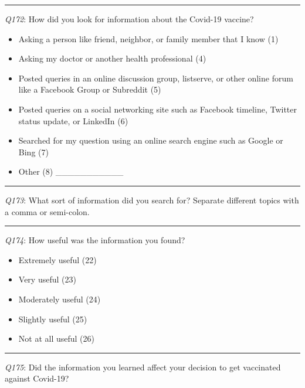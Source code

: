 \begin{singlespace}
\begin{center}\rule{0.5\linewidth}{0.5pt}\end{center}

\emph{Q172}: How did you look for information about the Covid-19 vaccine?

\begin{itemize}
\tightlist
\item
  Asking a person like friend, neighbor, or family member that I know (1)
\item
  Asking my doctor or another health professional (4)
\item
  Posted queries in an online discussion group, listserve, or other online forum like a Facebook Group or Subreddit (5)
\item
  Posted queries on a social networking site such as Facebook timeline, Twitter status update, or LinkedIn (6)
\item
  Searched for my question using an online search engine such as Google or Bing (7)
\item
  Other (8) \_\_\_\_\_\_\_\_\_\_\_
\end{itemize}

\begin{center}\rule{0.5\linewidth}{0.5pt}\end{center}

\emph{Q173}: What sort of information did you search for?
Separate different topics with a comma or semi-colon.

\begin{center}\rule{0.5\linewidth}{0.5pt}\end{center}

\emph{Q174}: How useful was the information you found?

\begin{itemize}
\tightlist
\item
  Extremely useful (22)
\item
  Very useful (23)
\item
  Moderately useful (24)
\item
  Slightly useful (25)
\item
  Not at all useful (26)
\end{itemize}

\begin{center}\rule{0.5\linewidth}{0.5pt}\end{center}

\emph{Q175}: Did the information you learned affect your decision to get vaccinated against Covid-19?


\end{singlespace}

